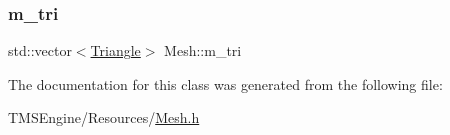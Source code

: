 \mbox{\label{class_mesh_adaffa1f6ca5a7bcd7ec504e55fb9a879}} 
\subsubsection{\texorpdfstring{m\+\_\+tri}{m\_tri}}
{\footnotesize\ttfamily std\+::vector$<$\hyperlink{struct_triangle}{Triangle}$>$ Mesh\+::m\+\_\+tri}



The documentation for this class was generated from the following file\+:\begin{DoxyCompactItemize}
\item 
T\+M\+S\+Engine/\+Resources/\hyperlink{_mesh_8h}{Mesh.\+h}\end{DoxyCompactItemize}
